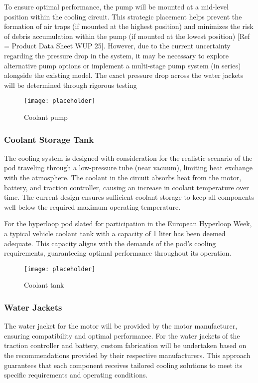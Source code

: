 To ensure optimal performance, the pump will be mounted at a mid-level position within the cooling circuit. This strategic placement helps prevent the formation of air traps (if mounted at the highest position) and minimizes the risk of debris accumulation within the pump (if mounted at the lowest position) [Ref = Product Data Sheet WUP 25]. However, due to the current uncertainty regarding the pressure drop in the system, it may be necessary to explore alternative pump options or implement a multi-stage pump system (in series) alongside the existing model. The exact pressure drop across the water jackets will be determined through rigorous testing
\begin{figure}[ht]
  \centering
  \texttt{[image: placeholder]}
  \caption{Coolant pump}
  \label{fig:Coolant Pump}
\end{figure}

\subsubsection{Coolant Storage Tank}
The cooling system is designed with consideration for the realistic scenario of the pod traveling through a low-pressure tube (near vacuum), limiting heat exchange with the atmosphere. The coolant in the circuit absorbs heat from the motor, battery, and traction controller, causing an increase in coolant temperature over time. The current design ensures sufficient coolant storage to keep all components well below the required maximum operating temperature.

For the hyperloop pod slated for participation in the European Hyperloop Week, a typical vehicle coolant tank with a capacity of 1 liter has been deemed adequate. This capacity aligns with the demands of the pod's cooling requirements, guaranteeing optimal performance throughout its operation.
\begin{figure}[ht]
  \centering
  \texttt{[image: placeholder]}
  \caption{Coolant tank}
  \label{fig:Coolant tank}
\end{figure}

\subsubsection{Water Jackets}
The water jacket for the motor will be provided by the motor manufacturer, ensuring compatibility and optimal performance. For the water jackets of the traction controller and battery, custom fabrication will be undertaken based on the recommendations provided by their respective manufacturers. This approach guarantees that each component receives tailored cooling solutions to meet its specific requirements and operating conditions.

